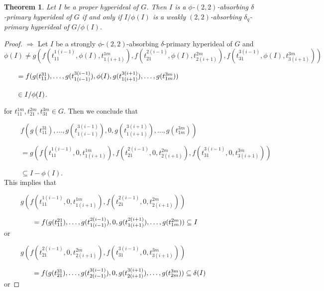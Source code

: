 \documentclass[preprint,review,10pt]{amsart}
\newtheorem{theorem}{Theorem}[section]
\theoremstyle{definition}
\theoremstyle{remark}
\numberwithin{equation}{section}
\begin{document}
\begin{theorem} \label{weak}
Let $I$ be a proper hyperideal of $G$. Then $I$  is   a  $\phi$-$(2,2)$-absorbing $\delta$-primary hyperideal of $G$ if and only if   $I/\phi(I)$ is a  weakly $(2,2)$-absorbing $\delta_q$-primary hyperideal of $G/\phi(I)$. 
\end{theorem}
\begin{proof}
 $\Longrightarrow$ Let  $I$  be  a strongly $\phi$-$(2,2)$-absorbing $\delta$-primary hyperideal of $G$ and \\

$\phi(I) \neq g(f(t_{11}^{1(i-1)},\phi(I),t_{1(i+1)}^{1m}),f(t_{21}^{2(i-1)},\phi(I),t_{2(i+1)}^{2m}),f(t_{31}^{3(i-1)},\phi(I),t_{3(i+1)}^{3m}))$

$\hspace{0.7cm}=f(g(t_{11}^{31}),\ldots,g(t_{1(i-1)}^{3(i-1)}),\phi(I),g(t_{1(i+1)}^{3(i+1)}),\ldots,g(t_{1m}^{3m}))$

$\hspace{0.7cm} \in I/\phi(I)$. 

for $t_{11}^{1m},t_{21}^{2m},t_{31}^{3m}\in G$.
Then we conclude that

$\hspace{1cm} f(g(t_{11}^{31}),\ldots, g(t_{1(i-1)}^{3(i-1)}),0,g(t_{1(i+1)}^{3(i+1)}),\ldots,g(t_{1m}^{3m}))$  

$\hspace{1cm}=g(f(t_{11}^{1(i-1)},0,t_{1(i+1)}^{1m}),f(t_{21}^{2(i-1)},0,t_{2(i+1)}^{2m}),f(t_{31}^{3(i-1)},0,t_{3(i+1)}^{3m}))$

$\hspace{1cm}\subseteq  I-\phi(I).$\\
This implies that

 $\hspace{1cm}g(f(t_{11}^{1(i-1)},0,t_{1(i+1)}^{1m}),f(t_{21}^{2(i-1)},0,t_{2(i+1)}^{2m}))$

$ \hspace{1.5cm}=f(g(t_{11}^{21}),\ldots,g(t_{1(i-1)}^{2(i-1)}),0,g(t_{1(i+1)}^{2(i+1)}),\ldots,g(t_{1m}^{2m}))\subseteq I$\\ or 

$\hspace{1cm}g(f(t_{21}^{2(i-1)},0,t_{2(i+1)}^{2m}),f(t_{31}^{3(i-1)},0,t_{3(i+1)}^{3m}))$

 $\hspace{1.5cm}=f(g(t_{21}^{31}),\ldots,g(t_{2(i-1)}^{3(i-1)}),0,g(t_{2(i+1)}^{3(i+1)}),\ldots,g(t_{2m}^{3m}))\subseteq \delta(I)$\\
or 



\end{proof}
\end{document}
